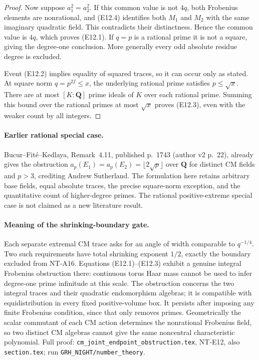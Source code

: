 \begin{proof}
Now suppose \(a_1^2=a_2^2\). If this common value is
not \(4q\), both Frobenius elements are nonrational,
and (E12.4) identifies both \(M_1\) and \(M_2\) with
the same imaginary quadratic field. This contradicts
their distinctness. Hence the common value is \(4q\),
which proves (E12.1). If \(q=p\) is a rational prime
it is not a square, giving the degree-one conclusion.
More generally every odd absolute residue degree is
excluded.

Event (E12.2) implies equality of squared traces, so
it can occur only as stated. At square norm \(q=p^{2f}\le x\),
the underlying rational prime satisfies \(p\le\sqrt x\).
There are at most \([K:\mathbf Q]\) prime ideals of \(K\)
over each rational prime. Summing this bound over
the rational primes at most \(\sqrt x\) proves
(E12.3), even with the weaker count by all integers.
\end{proof}


\paragraph{Earlier rational special case.}
Bucur--Fit\'e--Kedlaya, Remark~4.11, published p.~1743
(author v2 p.~22), already gives the obstruction
$a_p(E_1)=a_p(E_2)=\lfloor2\sqrt p\rfloor$ over
$\mathbf Q$ for distinct CM fields and $p>3$,
crediting Andrew Sutherland. The formulation here
retains arbitrary base fields, equal absolute traces,
the precise square-norm exception, and the quantitative
count of higher-degree primes. The rational positive-extreme
special case is not claimed as a new literature result.

\paragraph{Meaning of the shrinking-boundary gate.}
Each separate extremal CM trace asks for an angle
of width comparable to \(q^{-1/4}\). Two such
requirements have total shrinking exponent \(1/2\),
exactly the boundary excluded from NT-A16.
Equations (E12.1)--(E12.3) exhibit a genuine integral
Frobenius obstruction there: continuous torus Haar
mass cannot be used to infer degree-one prime
infinitude at this scale. The obstruction concerns
the two integral traces and their quadratic
endomorphism algebras; it is compatible with
equidistribution in every fixed positive-volume box.
It persists after imposing any finite Frobenius
condition, since that only removes primes.
Geometrically the scalar commutant of each CM action
determines the nonrational Frobenius field, so two
distinct CM algebras cannot give the same noncentral
characteristic polynomial.
Full proof: \texttt{cm\_joint\_endpoint\_obstruction.tex},
NT-E12, also \texttt{section.tex}; run
\texttt{GRH\_NIGHT/number\_theory}.
